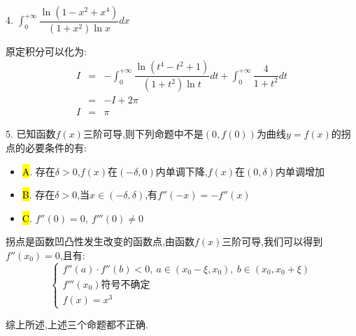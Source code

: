 4. $\int_{0}^{+\infty}\dfrac{\ln(1-x^2+x^4)}{(1+x^2)\ln x}dx$
\begin{solution}

	原定积分可以化为:  
	\begin{eqnarray*}
		I&=&-\int_{0}^{+\infty}\dfrac{\ln (t^4-t^2+1)}{(1+t^2)\ln t}dt+\int_{0}^{+\infty}\dfrac{4}{1+t^2}dt\\
		&=&-I+2\pi\\
		I&=&\pi
	\end{eqnarray*}
\end{solution}

5. 已知函数$f(x)$三阶可导,则下列命题中不是$(0,f(0))$为曲线$y=f(x)$的拐点的必要条件的有:  
\begin{itemize}
	\item \hl{A}. 存在$\delta>0$,$f(x)$在$(-\delta,0)$内单调下降,$f(x)$在$(0,\delta)$内单调增加
	\item \hl{B}. 存在$\delta>0$,当$x\in(-\delta,\delta)$,有$f''(-x)=-f''(x)$
	\item \hl{C}. $f''(0)=0,\ f'''(0)\neq 0$
\end{itemize}
\begin{solution}

	拐点是函数凹凸性发生改变的函数点,由函数$f(x)$三阶可导,我们可以得到$f''(x_{0})=0$,且有:  
	$$\left\lbrace
	\begin{array}{l}
		f''(a)\cdot f''(b)<0,\ a\in(x_{0}-\xi,x_{0}),\ b\in(x_{0},x_{0}+\xi)\\
		f'''(x_{0})\text{符号不确定}\\
		f(x)=x^3
	\end{array}
	\right. $$
	
	综上所述,上述三个命题都不正确.
\end{solution}

